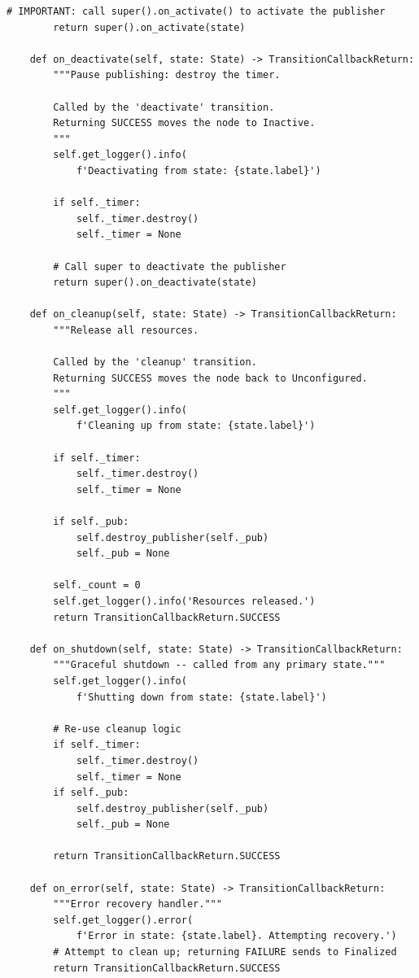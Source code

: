 \documentclass[11pt,a4paper]{csarticle}
\begin{document}
\begin{lstlisting}[style=python,caption={lifecycle\_talker.py -- full example}]
        # IMPORTANT: call super().on_activate() to activate the publisher
        return super().on_activate(state)

    def on_deactivate(self, state: State) -> TransitionCallbackReturn:
        """Pause publishing: destroy the timer.

        Called by the 'deactivate' transition.
        Returning SUCCESS moves the node to Inactive.
        """
        self.get_logger().info(
            f'Deactivating from state: {state.label}')

        if self._timer:
            self._timer.destroy()
            self._timer = None

        # Call super to deactivate the publisher
        return super().on_deactivate(state)

    def on_cleanup(self, state: State) -> TransitionCallbackReturn:
        """Release all resources.

        Called by the 'cleanup' transition.
        Returning SUCCESS moves the node back to Unconfigured.
        """
        self.get_logger().info(
            f'Cleaning up from state: {state.label}')

        if self._timer:
            self._timer.destroy()
            self._timer = None

        if self._pub:
            self.destroy_publisher(self._pub)
            self._pub = None

        self._count = 0
        self.get_logger().info('Resources released.')
        return TransitionCallbackReturn.SUCCESS

    def on_shutdown(self, state: State) -> TransitionCallbackReturn:
        """Graceful shutdown -- called from any primary state."""
        self.get_logger().info(
            f'Shutting down from state: {state.label}')

        # Re-use cleanup logic
        if self._timer:
            self._timer.destroy()
            self._timer = None
        if self._pub:
            self.destroy_publisher(self._pub)
            self._pub = None

        return TransitionCallbackReturn.SUCCESS

    def on_error(self, state: State) -> TransitionCallbackReturn:
        """Error recovery handler."""
        self.get_logger().error(
            f'Error in state: {state.label}. Attempting recovery.')
        # Attempt to clean up; returning FAILURE sends to Finalized
        return TransitionCallbackReturn.SUCCESS


\end{lstlisting}
\end{document}
